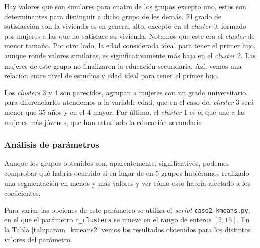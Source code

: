 \documentclass[a4paper, 20pt]{article}
\begin{document}
Hay valores que son similares para cuatro de los grupos excepto uno, estos son determinantes para distinguir a dicho grupo de los demás. El grado de satisfacción con la vivienda es en general alto, excepto en el \textit{cluster} 0, formado por mujeres a las que no satisface su vivienda. Notamos que este era el \textit{cluster} de menor tamaño. Por otro lado, la edad considerada ideal para tener el primer hijo, aunque ronde valores similares, es significativamente más baja en el \textit{cluster} 2. Las mujeres de este grupo no finalizaron la educación secundaria. Así, vemos una relación entre nivel de estudios y edad ideal para tener el primer hijo.

Los \textit{clusters} 3 y 4 son parecidos, agrupan a mujeres con un grado universitario, para diferenciarlos atendemos a la variable edad, que en el caso del \textit{cluster} 3 será menor que 35 años y en el 4 mayor. Por último, el \textit{cluster} 1 es el que une a las mujeres más jóvenes, que han estudiado la educación secundaria.

\subsubsection{Análisis de parámetros}

Aunque los grupos obtenidos son, aparentemente, significativos, podemos comprobar qué habría ocurrido si en lugar de en 5 grupos hubiéramos realizado una segmentación en menos y más valores y ver cómo esto habría afectado a los coeficientes.

Para variar las opciones de este parámetro se utiliza el \textit{script} \texttt{caso2-kmeans.py}, en el que el parámetro \texttt{n\_clusters} se mueve en el rango de enteros $[2,15]$. En la Tabla \ref{tab:param_kmeans2} vemos los resultados obtenidos para los distintos valores del parámetro.
\end{document}

